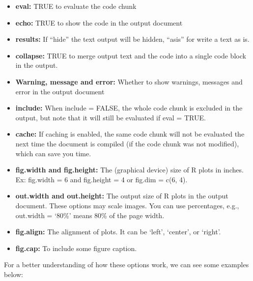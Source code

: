 \documentclass[]{article}
\providecommand{\tightlist}{%
  \setlength{\itemsep}{0pt}\setlength{\parskip}{0pt}}
\begin{document}
\begin{itemize}
\tightlist
\item
  \textbf{eval:} TRUE to evaluate the code chunk\\
\item
  \textbf{echo:} TRUE to show the code in the output document\\
\item
  \textbf{results:} If ``hide'' the text output will be hidden, ``asis''
  for write a text as is.\\
\item
  \textbf{collapse:} TRUE to merge output text and the code into a
  single code block in the output.\\
\item
  \textbf{Warning, message and error:} Whether to show warnings,
  messages and error in the output document
\item
  \textbf{include:} When include = FALSE, the whole code chunk is
  excluded in the output, but note that it will still be evaluated if
  eval = TRUE.\\
\item
  \textbf{cache:} If caching is enabled, the same code chunk will not be
  evaluated the next time the document is compiled (if the code chunk
  was not modified), which can save you time.\\
\item
  \textbf{fig.width and fig.height:} The (graphical device) size of R
  plots in inches. Ex: fig.width = 6 and fig.height = 4 or fig.dim =
  c(6, 4).\\
\item
  \textbf{out.width and out.height:} The output size of R plots in the
  output document. These options may scale images. You can use
  percentages, e.g., out.width = `80\%' means 80\% of the page width.\\
\item
  \textbf{fig.align:} The alignment of plots. It can be `left',
  `center', or `right'.\\
\item
  \textbf{fig.cap: } To include some figure caption.
\end{itemize}

For a better understanding of how these options work, we can see some
examples below:
\end{document}
